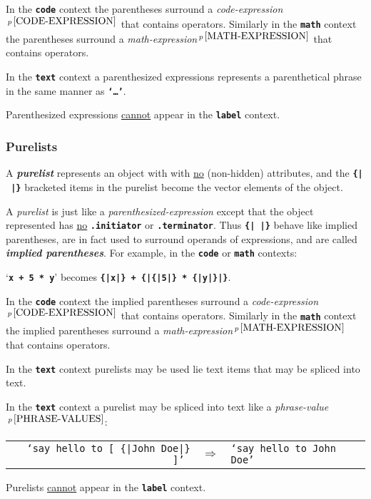 \documentclass[12pt]{article}
\newcommand{\TT}[1]{{\tt \bfseries #1}}
\newcommand{\key}[1]{{\bf \em #1}\index{#1}}
\newcommand{\ikey}[2]{{\bf \em #1}\index{#2}}
\newcommand{\pagnote}[1]{$\,^{p\,\pageref{#1}}$}
\newenvironment{indpar}[1][0.3in]%
	{\begin{list}{}%
		     {\setlength{\itemsep}{0in}%
		      \setlength{\topsep}{0in}%
		      \setlength{\parsep}{1ex}%
		      \setlength{\labelwidth}{#1}%
		      \setlength{\leftmargin}{#1}%
		      \addtolength{\leftmargin}{\labelsep}}%
	 \item}%
	{\end{list}}
\begin{document}
In the \TT{code} context the parentheses surround
a {\em code-expression}\pagnote{CODE-EXPRESSION} that contains operators.
Similarly in the \TT{math} context the parentheses surround
a {\em math-expression}\pagnote{MATH-EXPRESSION} that contains operators.

In the \TT{text} context a parenthesized expressions represents a parenthetical
phrase in the same manner as \TT{`\dots'}.

Parenthesized expressions \underline{cannot} appear in the
\TT{label} context.

\subsubsection{Purelists}
\label{PURELISTS}

A \key{purelist} represents an object with with
\underline{no} (non-hidden) attributes, and the
\TT{\{|~|\}} bracketed items in the purelist
become the vector elements of the object.

A {\em purelist} is just like a {\em parenthesized-expression} except that
the object represented has \underline{no} \TT{.ini\-ti\-ator}
or \TT{.ter\-min\-ator}.
Thus \TT{\{|~|\}} behave like implied parentheses, are in fact used to
surround operands of expressions, and are called
\ikey{implied parentheses}{implied parenthesis}.
For example, in the \TT{code} or \TT{math} contexts: \\
\centerline{`\TT{x + 5 * y}' becomes \TT{\{|x|\} + \{|\{|5|\} * \{|y|\}|\}}.}

In the \TT{code} context the implied parentheses surround
a {\em code-expression}\pagnote{CODE-EXPRESSION} that contains operators.
Similarly in the \TT{math} context the implied parentheses surround
a {\em math-expression}\pagnote{MATH-EXPRESSION} that contains operators.

In the \TT{text} context purelists may be used lie
text items that may be spliced into text.

In the \TT{text} context a purelist may be spliced into text like
a {\em phrase-value}\pagnote{PHRASE-VALUES}:
\begin{indpar}[1em]
\begin{tabular}{rcl}
\tt `say hello to \TT{[} \{|John Doe|\} \TT{]}' & $\Longrightarrow$
                                           & \tt `say hello to John Doe'
\end{tabular}
\end{indpar}

Purelists \underline{cannot} appear in the \TT{label} context.
\end{document}
